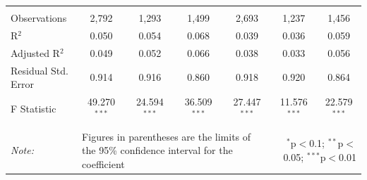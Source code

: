 \documentclass[alpha-refs]{wiley-article-01g}
\begin{document}
\begin{landscape}
\begin{table}[!htbp]
\begin{tabular}{@{\extracolsep{5pt}}lcccccc}
  & & & & & & \\ 
\hline \\[-3ex] 
Observations & 2,792 & 1,293 & 1,499 & 2,693 & 1,237 & 1,456 \\ 
R$^{2}$ & 0.050 & 0.054 & 0.068 & 0.039 & 0.036 & 0.059 \\ 
Adjusted R$^{2}$ & 0.049 & 0.052 & 0.066 & 0.038 & 0.033 & 0.056 \\ 
Residual Std. Error & 0.914 & 0.916 & 0.860 & 0.918 & 0.920 & 0.864 \\ 
F Statistic & 49.270$^{***}$ & 24.594$^{***}$ & 36.509$^{***}$ & 27.447$^{***}$ & 11.576$^{***}$ & 22.579$^{***}$ \\ 
\hline 
\hline \\[-3ex] 
\textit{Note:} &\multicolumn{4}{l}{Figures in parentheses are the limits of the 95\% confidence interval for the coefficient}  & \multicolumn{2}{r}{$^{*}$p$<$0.1; $^{**}$p$<$0.05; $^{***}$p$<$0.01} \\ 
\end{tabular} 
\end{table} 

\end{landscape}

\newpage
\end{document}
